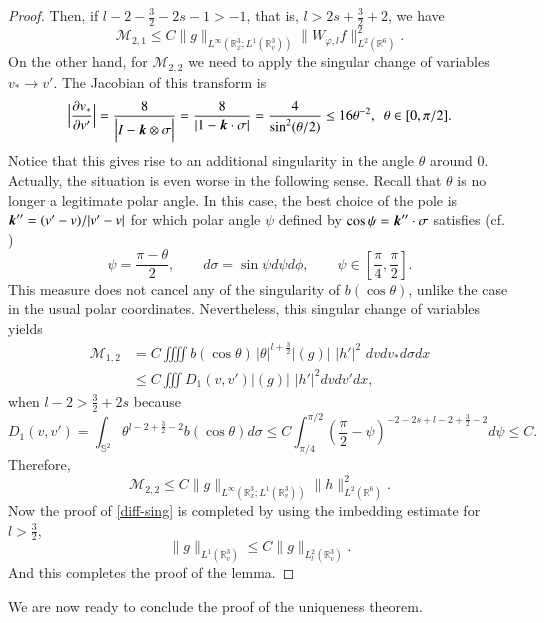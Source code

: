 \documentclass{amsart}[12pt, article]
\begin{document}
\begin{proof}
Then, if $l-2-\frac 32-2s-1>-1$, that is,  $l>2s+\frac 32 +2$, we have
$${{\mathcal M}}_{2,1} \leq C  \|g\|_{L^\infty({{{\mathbb R}}}_x^3; L^1({{{\mathbb R}}}_v^3))} \|W_{\varphi, l}f\|_{L^2({{{\mathbb R}}}^6)}^2.$$
On the other hand, for ${{\mathcal M}}_{2,2}$ we need to apply
the singular change of
variables $v_* \rightarrow v'$. The Jacobian of this transform
is
\begin{equation*}
\Big|\frac{{{\partial}} v_*}{{{\partial}} v'}\Big|=\frac{8}{ \Big|I- {\mbox{\boldmath $k$}}\otimes
\sigma\Big|}=\frac{8}{|1-{\mbox{\boldmath $k$}}\cdot\sigma|} =\frac{4}{\sin^2
(\theta/2)}\le 16\theta^{-2}, \ \ \theta\in[0,\pi/2].
\end{equation*}
Notice that this gives rise to an additional singularity
in the angle $\theta$ around $0$. Actually, the
situation is even worse in the following sense.
Recall that $\theta$ is no longer
a legitimate polar angle. In this case, the best choice of the pole is
${\mbox{\boldmath $k$}}''=(v'-v)/|v'-v|$ for which polar angle $\psi$ defined by
$\cos\psi={\mbox{\boldmath $k$}}''\cdot\sigma $  satisfies (cf. \cite[Fig. 1]{al-1})
\[
\psi=\frac{\pi-\theta}{2}, \qquad d\sigma=\sin\psi d\psi d\phi,
\qquad \psi\in[\frac{\pi}{4},\frac{\pi}{2}].
\]
This measure does not cancel any of the singularity of $b(\cos\theta)$,
unlike the case in the usual polar coordinates.
Nevertheless, this singular change of variables yields
\begin{align*}
{{\mathcal M}}_{1,2} &= C \iiiint  b(\cos\theta)\, |\theta|^{l+ \frac{3}{2}}
|(g)|\,\,|h'|^2\,\,dvdv_*d\sigma dx \\
&\leq C\iiint D_1(v, v') |(g)|\,\,|h'|^2dv dv' dx,
\end{align*}
when $l-2>\frac 32+2s$ because
\[
D_1(v,v')=\int_{{\mathbb{S}}^2}\theta^{l-2+\frac 32-2}b(\cos\theta)d\sigma \le
C \int_{\pi/4}^{\pi/2}(\frac{\pi}{2}-\psi)^{-2-2s+l-2+\frac 32-2}d\psi
\le C.
\]
Therefore,
\begin{equation*}
{{\mathcal M}}_{2,2} \leq C \|g\|_{L^\infty({{{\mathbb R}}}^3_x;L^1({{{\mathbb R}}}_v^3))} \|h\|_{L^2({{{\mathbb R}}}^6)}^2.
\end{equation*}
Now the proof of \eqref{diff-sing} is completed by using the imbedding estimate
for $l>\frac 32$,
$$
\|g\|_{L^1({{{\mathbb R}}}_v^3)}\leq C\|g\|_{L^2_l({{{\mathbb R}}}_v^3)}.
$$
And this completes the proof of the lemma.
\end{proof}

We are now ready to conclude the proof of the uniqueness theorem.\\
\end{document}

